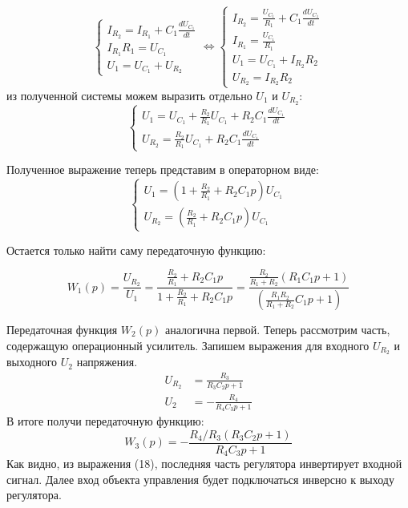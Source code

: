 \documentclass[russian, utf8]{eskdtext}
\begin{document}
\begin{equation*}
    \begin{cases}
        I_{R_2} = I_{R_1} + C_1\frac{dU_{C_1}}{dt} \\
        I_{R_1}R_1 = U_{C_1} \\
        U_1 = U_{C_1} + U_{R_2}
    \end{cases}
    \Leftrightarrow
    \begin{cases}
        I_{R_2} = \frac{U_{C_1}}{R_1} + C_1\frac{dU_{C_1}}{dt} \\
        I_{R_1} = \frac{U_{C_1}}{R_1} \\
        U_1 = U_{C_1} + I_{R_2}R_2 \\
        U_{R_2} = I_{R_2}R_2
    \end{cases}
\end{equation*}
из полученной системы можем выразить отдельно $U_1$ и $U_{R_2}$:
\begin{equation*}
    \begin{cases}
        U_1 = U_{C_1} + \frac{R_2}{R_1}U_{C_1} + R_2C_1\frac{dU_{C_1}}{dt} \\
        U_{R_2} = \frac{R_2}{R_1}U_{C_1} + R_2C_1\frac{dU_{C_1}}{dt}
    \end{cases}
\end{equation*} \par
Полученное выражение теперь представим в операторном виде:
\begin{equation*}
    \begin{cases}
        U_1 = \left( 1 + \frac{R_2}{R_1} + R_2C_1p \right) U_{C_1} \\
        U_{R_2} = \left( \frac{R_2}{R_1} + R_2C_1p \right) U_{C_1}
    \end{cases}
\end{equation*} \par

Остается только найти саму передаточную функцию: \par
\begin{equation}
    W_1(p) = \frac{U_{R_2}}{U_1} = \frac{\frac{R_2}{R_1} + R_2C_1p}{1 + \frac{R_2}{R_1} + R_2C_1p} = \frac{\frac{R_2}{R_1 + R_2}\left( R_1C_1p + 1 \right)}{\left( \frac{R_1R_2}{R_1 + R_2}C_1p + 1 \right)}
\end{equation}

Передаточная функция $W_2(p)$ аналогична первой. Теперь рассмотрим часть, содержащую операционный усилитель. Запишем выражения для входного $U_{R_2}$ и выходного $U_2$ напряжения.
\begin{align*}
    U_{R_2} & = \frac{R_3}{R_3C_2 p + 1} \\
    U_2 & = -\frac{R_4}{R_4C_3 p + 1}
\end{align*}
В итоге получи передаточную функцию:
\begin{equation}
    W_3(p) = -\frac{R_4/R_3(R_3 C_2 p + 1)}{R_4C_3 p + 1}
\end{equation}
Как видно, из выражения (18), последняя часть регулятора инвертирует входной сигнал. Далее вход объекта управления будет подключаться инверсно к выходу регулятора.
\end{document}
